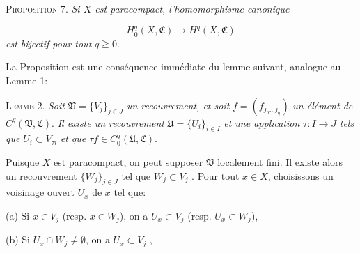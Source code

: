 %
%
%
\textsc{Proposition} 7. \textit{Si $X$ est paracompact, l'homomorphisme canonique}

\begin{equation*}
H_0^q(X, \mathfrak{C}) \longrightarrow H^q(X, \mathfrak{C})
\end{equation*}
\textit{est bijectif pour tout} $q \geqq 0$.

La Proposition est une conséquence immédiate du lemme suivant, analogue au Lemme 1:

\textsc{Lemme} 2. \textit{Soit} $\mathfrak{V} = \{V_j\}_{j \in J}$ \textit{un recouvrement, et soit} $f = (f_{j_0 \ldots j_q})$ \textit{un élément de} $C^q(\mathfrak{V}, \mathfrak{C})$. \textit{Il existe un recouvrement} $\mathfrak{U} = \{U_i\}_{i \in I}$ \textit{et une application} $\tau: I \rightarrow J$ \textit{tels que} $U_i \subset V_{\tau i}$ \textit{et que} $\tau f \in C_0^q(\mathfrak{U}, \mathfrak{C})$.

Puisque $X$ est paracompact, on peut supposer $\mathfrak{V}$ localement fini. Il existe alors un recouvrement $\{W_j\}_{j \in J}$ tel que $\overline{W}_j \subset V_j$ . Pour tout $x \in X$, choisissons un voisinage ouvert $U_x$ de $x$ tel que:

(a) Si $x \in V_j$ (resp. $x \in W_j$), on a $U_x \subset V_j$ (resp. $U_x \subset W_j$),

(b) Si $U_x \cap W_j \neq \emptyset$, on a $U_x \subset V_j$ ,

